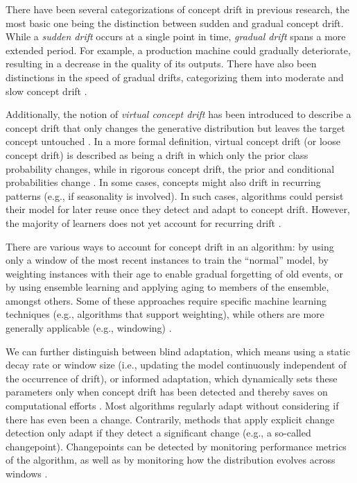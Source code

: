 There have been several categorizations of concept drift in previous research, the most basic one being the distinction between sudden and gradual concept drift. While a \emph{sudden drift} occurs at a single point in time, \emph{gradual drift} spans a more extended period. For example, a production machine could gradually deteriorate, resulting in a decrease in the quality of its outputs. There have also been distinctions in the speed of gradual drifts, categorizing them into moderate and slow concept drift \citep{tsymbal_problem_2004}.

Additionally, the notion of \emph{virtual concept drift} has been introduced to describe a concept drift that only changes the generative distribution but leaves the target concept untouched \citep{tsymbal_problem_2004, siekmann_effective_1993}. In a more formal definition, virtual concept drift (or loose concept drift) is described as being a drift in which only the prior class probability changes, while in rigorous concept drift, the prior and conditional probabilities change \citep{bifet_new_2009}. In some cases, concepts might also drift in recurring patterns (e.g., if seasonality is involved). In such cases, algorithms could persist their model for later reuse once they detect and adapt to concept drift. However, the majority of learners does not yet account for recurring drift \citep{tsymbal_problem_2004}.

There are various ways to account for concept drift in an algorithm: by using only a window of the most recent instances to train the ``normal'' model, by weighting instances with their age to enable gradual forgetting of old events, or by using ensemble learning and applying aging to members of the ensemble, amongst others. Some of these approaches require specific machine learning techniques (e.g., algorithms that support weighting), while others are more generally applicable (e.g., windowing) \citep{tsymbal_problem_2004}. 

We can further distinguish between blind adaptation, which means using a static decay rate or window size (i.e., updating the model continuously independent of the occurrence of drift), or informed adaptation, which dynamically sets these parameters only when concept drift has been detected and thereby saves on computational efforts \citep{schneider_expected_2016, talagala_anomaly_2019}. Most algorithms regularly adapt without considering if there has even been a change. Contrarily, methods that apply explicit change detection only adapt if they detect a significant change (e.g., a so-called changepoint). Changepoints can be detected by monitoring performance metrics of the algorithm, as well as by monitoring how the distribution evolves across windows \citep{gama_survey_2012}.


